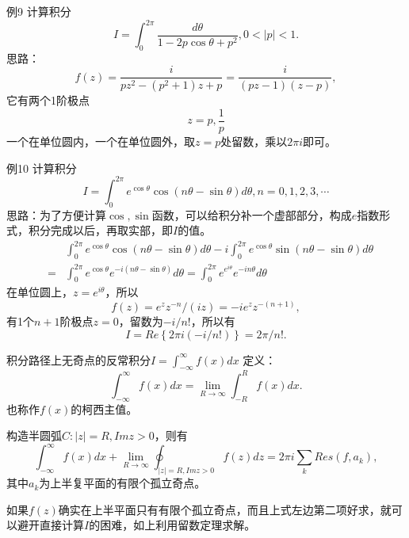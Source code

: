 \documentclass[11pt]{beamer}
\newcommand{\kong}[1][0.5]{\vspace{#1cm}}
\begin{document}
\begin{frame}{例9}
计算积分
\begin{equation}
I = \int^{2\pi}_0 \frac{d\theta}{1 - 2p \cos \theta + p^2},
0 <|p|<1.
\end{equation}
思路：
\begin{equation}
f(z) = \frac{i}{pz^2 - (p^2+1)z +p}
=\frac{i}{(pz-1)(z-p)},
\end{equation}
它有两个1阶极点
\begin{equation}
z = p, \frac{1}{p}
\end{equation}
一个在单位圆内，一个在单位圆外，取$z=p$处留数，乘以$2\pi i$即可。
\end{frame}

\begin{frame}{例10}
计算积分
\begin{equation}
I = \int^{2\pi}_0 e^{\cos \theta} \cos(n\theta - \sin \theta) d \theta, n=0,1,2,3,\cdots
\end{equation}
思路：为了方便计算$\cos, \sin$函数，可以给积分补一个虚部部分，构成$e$指数形式，积分完成以后，再取实部，即$I$的值。
\begin{eqnarray}
&& \int^{2\pi}_0 e^{\cos \theta} \cos(n\theta - \sin \theta) d \theta 
- i \int^{2\pi}_0 e^{\cos \theta} \sin(n\theta - \sin \theta) d \theta
\nonumber \\
&=& \int^{2\pi}_0 e^{\cos \theta} e^{-i(n\theta - \sin \theta)} d \theta
= \int^{2\pi}_0 e^{e^{i\theta}} e^{-in\theta} d \theta
\end{eqnarray}
在单位圆上，$z = e^{i\theta}$，所以
\begin{equation}
f(z) = e^z z^{-n} / (iz) = -i e^z z^{-(n+1)},
\end{equation}
有1个$n+1$阶极点$z=0$，留数为$-i/n!$，所以有
\begin{equation}
I = Re \left\{ 2\pi i (-i/n!) \right\} = 2\pi /n!.
\end{equation}
\end{frame}

\begin{frame}{积分路径上无奇点的反常积分$I = \int^\infty_{-\infty}f(x)dx$}
定义：
\begin{equation}
\int^\infty_{-\infty}f(x)dx = \lim_{R \rightarrow \infty} \int^R_{-R} f(x) dx.
\end{equation}
也称作$f(x)$的柯西主值。

构造半圆弧$C: |z|=R, Im z >0$，则有
\begin{equation}
\int^\infty_{-\infty}f(x)dx + \lim\limits_{R \rightarrow \infty} \oint_{|z|=R,Im z>0} f(z) dz = 2 \pi i \sum_k Res(f, a_k),
\end{equation}
其中$a_k$为上半复平面的有限个孤立奇点。

\kong[0.5]
如果$f(z)$确实在上半平面只有有限个孤立奇点，而且上式左边第二项好求，就可以避开直接计算$I$的困难，如上利用留数定理求解。

\end{frame}
\end{document}
